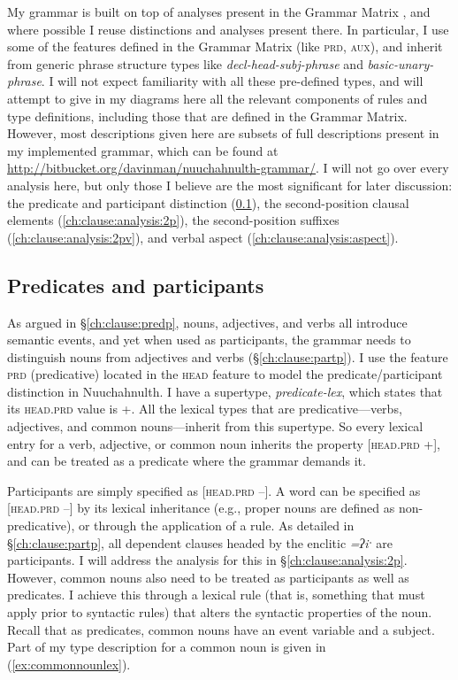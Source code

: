 My grammar is built on top of analyses present in the Grammar Matrix \citep{bender2002}, and where possible I reuse distinctions and analyses present there. In particular, I use some of the features defined in the Grammar Matrix (like \textsc{prd}, \textsc{aux}), and inherit from generic phrase structure types like \textit{decl-head-subj-phrase} and \textit{basic-unary-phrase}. I will not expect familiarity with all these pre-defined types, and will attempt to give in my diagrams here all the relevant components of rules and type definitions, including those that are defined in the Grammar Matrix. However, most descriptions given here are subsets of full descriptions present in my implemented grammar, which can be found at \url{http://bitbucket.org/davinman/nuuchahnulth-grammar/}. I will not go over every analysis here, but only those I believe are the most significant for later discussion: the predicate and participant distinction (\ref{ch:clause:analysis:predpart}), the second-position clausal elements (\ref{ch:clause:analysis:2p}), the second-position suffixes (\ref{ch:clause:analysis:2pv}), and verbal aspect (\ref{ch:clause:analysis:aspect}).

\subsection{Predicates and participants} \label{ch:clause:analysis:predpart}

As argued in \S\ref{ch:clause:predp}, nouns, adjectives, and verbs all introduce semantic events, and yet when used as participants, the grammar needs to distinguish nouns from adjectives and verbs (\S\ref{ch:clause:partp}). I use the feature \textsc{prd} (predicative) located in the \textsc{head} feature to model the predicate/participant distinction in Nuuchahnulth. I have a supertype, \textit{predicate-lex}, which states that its \textsc{head.prd} value is +. All the lexical types that are predicative---verbs, adjectives, and common nouns---inherit from this supertype. So every lexical entry for a verb, adjective, or common noun inherits the property [\textsc{head.prd} +], and can be treated as a predicate where the grammar demands it.

Participants are simply specified as [\textsc{head.prd} --]. A word can be specified as [\textsc{head.prd} --] by its lexical inheritance (e.g., proper nouns are defined as non-predicative), or through the application of a rule. As detailed in \S\ref{ch:clause:partp}, all dependent clauses headed by the enclitic \textit{=ʔiˑ} are participants. I will address the analysis for this in \S\ref{ch:clause:analysis:2p}. However, common nouns also need to be treated as participants as well as predicates. I achieve this through a lexical rule (that is, something that must apply prior to syntactic rules) that alters the syntactic properties of the noun. Recall that as predicates, common nouns have an event variable and a subject. Part of my type description for a common noun is given in (\ref{ex:commonnounlex}).

